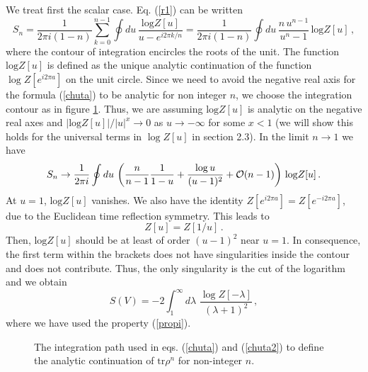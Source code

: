 \documentclass[a4paper]{article}
\begin{document}
We treat first the scalar case. Eq. (\ref{r1}) can be written 
\begin{equation}
S_n=\frac{1}{2\pi i (1-n)}\sum_{k=0}^{n-1}\oint du \, \frac{\textrm{log}Z[u]}{u-e^{i 2 \pi k/n}}=\frac{1}{2\pi i (1-n)}\oint du \,\frac{n\, u^{n-1}}{u^n-1}\,\textrm{log}Z[u]\,,\label{chuta}
\end{equation}
where the contour of integration encircles the roots of the unit. The function $\textrm{log}Z[u]$ is defined as the unique analytic continuation of the function $\log Z[e^{i 2\pi a}]$ on the unit circle.
 Since  we need to avoid the negative real axis for the formula (\ref{chuta}) to be analytic for non integer $n$, we choose the integration contour as in figure \ref{figu22}. Thus, we are assuming $\textrm{log}Z[u]$ is analytic on the negative real axes and $\left|\textrm{log} Z[u]\right|/\left|u\right|^x\rightarrow 0$ as $u\rightarrow-\infty$ for some $x<1$ (we will show this holds for the universal terms in $\log Z[u]$ in section 2.3). In the limit $n\rightarrow 1$ we have
\begin{equation}
S_n\rightarrow \frac{1}{2\pi i}\oint du \,\left(\frac{n}{n-1}\frac{1}{1-u}+\frac{\log u}{(u-1)^2}+{\cal O} (n-1)\right)\,\textrm{log}Z[u]\,.\label{chuta1}
\end{equation} 
 At $u=1$, $\textrm{log}Z[u]$ vanishes. We also have the identity $Z[e^{i 2 \pi a}]=Z[e^{-i 2 \pi a}]$, due to the Euclidean time reflection symmetry. This leads to
\begin{equation}
Z[u]=Z[1/u] \label{propi}\,.
\end{equation}
Then,  $\textrm{log}Z[u]$ should be at least of order $(u-1)^2$ near $u=1$. In consequence, the first term within the brackets does not have singularities inside the contour and does not contribute. Thus, the only singularity is the cut of the logarithm and we obtain
\begin{equation}
S(V)=-2\int_1^{\infty}d\lambda\,\, \frac{\log Z[-\lambda]}{(\lambda+1)^2}\,,\label{boti}
\end{equation} 
where we have used the property (\ref{propi}).

\begin{figure} [tbp]
\centering
\leavevmode
\epsfysize=4.3cm
\bigskip
{}
\caption{The integration path used in eqs. (\ref{chuta}) and (\ref{chuta2}) to define the analytic continuation of $\textrm{tr}\rho^n$ for non-integer $n$.}
\label{figu22}
\end{figure}
\end{document}
